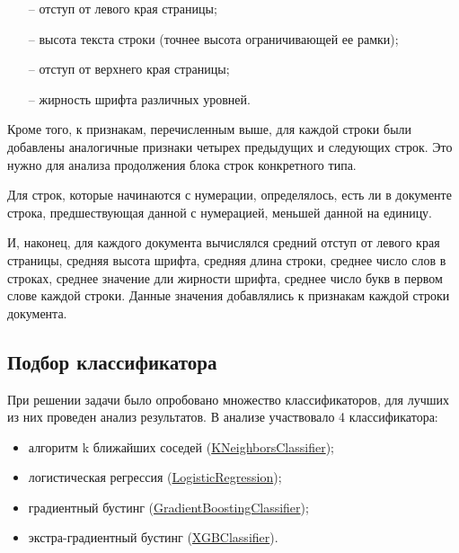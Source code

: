 \documentclass[10pt, a4paper]{ieeeconf}
\begin{document}
\begin{itemize}
  \begin{itemize}

    \item[--] отступ от левого края страницы;
    \item[--] высота текста строки (точнее высота ограничивающей ее рамки);
    \item[--] отступ от верхнего края страницы;
    \item[--] жирность шрифта различных уровней.

  \end{itemize}

\end{itemize}

Кроме того, к признакам, перечисленным выше, для каждой строки были добавлены аналогичные признаки четырех предыдущих и следующих строк. Это нужно для анализа продолжения блока строк конкретного типа.

Для строк, которые начинаются с нумерации, определялось, есть ли в документе строка, предшествующая данной с нумерацией, меньшей данной на единицу.

И, наконец, для каждого документа вычислялся средний отступ от левого края страницы, средняя высота шрифта, средняя длина строки, среднее число слов в строках, среднее значение дли жирности шрифта, среднее число букв в первом слове каждой строки. Данные значения добавлялись к признакам каждой строки документа.

\subsection{Подбор классификатора}

При решении задачи было опробовано множество классификаторов, для лучших из них проведен анализ результатов. В анализе участвовало 4 классификатора:

\begin{itemize}

  \item алгоритм k ближайших соседей (\href{https://scikit-learn.org/stable/modules/generated/sklearn.neighbors.KNeighborsClassifier.html}{KNeighborsClassifier});
  \item логистическая регрессия (\href{https://scikit-learn.org/stable/modules/generated/sklearn.linear_model.LogisticRegression.html}{LogisticRegression});
  \item градиентный бустинг (\href{https://scikit-learn.org/stable/modules/generated/sklearn.ensemble.GradientBoostingClassifier.html}{GradientBoostingClassifier});
  \item экстра-градиентный бустинг (\href{https://xgboost.readthedocs.io/en/latest/}{XGBClassifier}).

\end{itemize}
\end{document}
